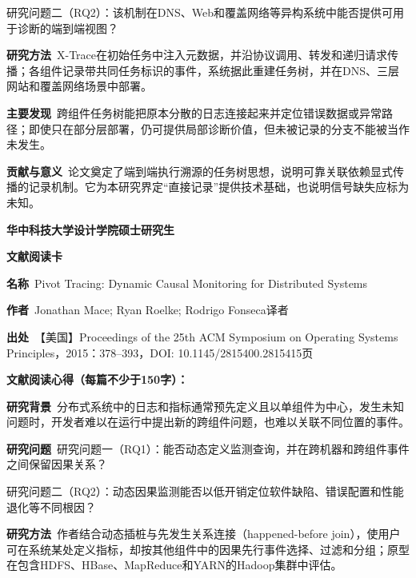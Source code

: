 研究问题二（RQ2）：该机制在DNS、Web和覆盖网络等异构系统中能否提供可用于诊断的端到端视图？\par
\noindent\textbf{研究方法}\ X-Trace在初始任务中注入元数据，并沿协议调用、转发和递归请求传播；各组件记录带共同任务标识的事件，系统据此重建任务树，并在DNS、三层网站和覆盖网络场景中部署。\par
\noindent\textbf{主要发现}\ 跨组件任务树能把原本分散的日志连接起来并定位错误数据或异常路径；即使只在部分层部署，仍可提供局部诊断价值，但未被记录的分支不能被当作未发生。\par
\noindent\textbf{贡献与意义}\ 论文奠定了端到端执行溯源的任务树思想，说明可靠关联依赖显式传播的记录机制。它为本研究界定“直接记录”提供技术基础，也说明信号缺失应标为未知。\par
\clearpage
\begin{center}
{\songti\bfseries\fontsize{18.5pt}{27.75pt}\selectfont 华中科技大学设计学院硕士研究生\par}
{\songti\bfseries\fontsize{18.5pt}{27.75pt}\selectfont 文献阅读卡\par}
\end{center}
\vspace{0.25em}
\noindent\underline{}\par
\vspace{0.35em}
\noindent\textbf{名称}\ Pivot Tracing: Dynamic Causal Monitoring for Distributed Systems\par
\noindent\textbf{作者}\ Jonathan Mace; Ryan Roelke; Rodrigo Fonseca\quad 译者\par
\noindent\textbf{出处}\ 【美国】Proceedings of the 25th ACM Symposium on Operating Systems Principles，2015：378–393，DOI: 10.1145/2815400.2815415\quad 页\par
\vspace{0.35em}
\noindent\textbf{文献阅读心得（每篇不少于150字）：}\par
\noindent\textbf{研究背景}\ 分布式系统中的日志和指标通常预先定义且以单组件为中心，发生未知问题时，开发者难以在运行中提出新的跨组件问题，也难以关联不同位置的事件。\par
\noindent\textbf{研究问题}\ 研究问题一（RQ1）：能否动态定义监测查询，并在跨机器和跨组件事件之间保留因果关系？\par
研究问题二（RQ2）：动态因果监测能否以低开销定位软件缺陷、错误配置和性能退化等不同根因？\par
\noindent\textbf{研究方法}\ 作者结合动态插桩与先发生关系连接（happened-before join），使用户可在系统某处定义指标，却按其他组件中的因果先行事件选择、过滤和分组；原型在包含HDFS、HBase、MapReduce和YARN的Hadoop集群中评估。\par
